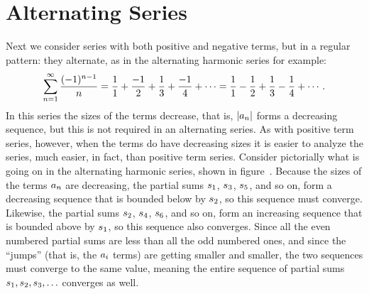 \section{Alternating Series}{}{}
\nobreak
Next we consider series with both positive and negative terms, but in
a regular pattern: they alternate, as in the {\dfont alternating
  harmonic series%
%
\/} for example:
$$
  \sum_{n=1}^\infty {(-1)^{n-1}\over n}=
  {1\over1}+{-1\over2}+{1\over3}+{-1\over4}+\cdots=
  {1\over1}-{1\over2}+{1\over3}-{1\over4}+\cdots.
$$
In this series the sizes of the terms decrease, that is, 
$\displaystyle |a_n|$ forms a decreasing sequence, but this is not required in an
alternating series. As with positive term series, however, when the
terms do have decreasing sizes it is easier to analyze the series,
much easier, in fact, than positive term series. Consider pictorially
what is going on in the alternating harmonic series, shown in
figure~. Because the sizes of
the terms $\displaystyle a_n$ are decreasing, the partial sums $\displaystyle s_1$, $\displaystyle s_3$, $\displaystyle s_5$,
and so on, form a decreasing sequence that is bounded below by
$\displaystyle s_2$, so this sequence must converge.
Likewise, the partial sums $\displaystyle s_2$, $\displaystyle s_4$, $\displaystyle s_6$,
and so on, form an increasing sequence that is bounded above by
$\displaystyle s_1$, so this sequence also converges. Since all the even numbered
partial sums are less than all the odd numbered ones, and since the
``jumps'' (that is, the $\displaystyle a_i$ terms) are getting smaller and smaller,
the two sequences must converge to the same value, meaning the entire
sequence of partial sums $\displaystyle s_1,s_2,s_3,\ldots$ converges as well.

